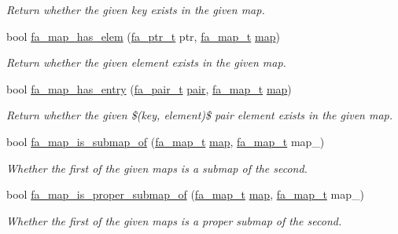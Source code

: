 \begin{DoxyCompactItemize}
\begin{DoxyCompactList}\small\item\em Return whether the given key exists in the given map. \end{DoxyCompactList}\item 
bool \hyperlink{group___fa_map_gac36e905827b6b35ce95fb8add39ec61a}{fa\-\_\-map\-\_\-has\-\_\-elem} (\hyperlink{group___fa_ga915ddeae99ad7568b273d2b876425197}{fa\-\_\-ptr\-\_\-t} ptr, \hyperlink{group___fa_map_gadcbb0c425af31be6aeb265159b2a7db0}{fa\-\_\-map\-\_\-t} \hyperlink{literals_8h_a44305f0bc81207be0dcc90650733e331}{map})
\begin{DoxyCompactList}\small\item\em Return whether the given element exists in the given map. \end{DoxyCompactList}\item 
bool \hyperlink{group___fa_map_ga7001e19d64d3e0a95c4f49ec07c06ea9}{fa\-\_\-map\-\_\-has\-\_\-entry} (\hyperlink{group___fa_pair_gac2b2e58c230bac4f8a63ef6c05072680}{fa\-\_\-pair\-\_\-t} \hyperlink{util_8h_a40ed40659d2ed7f8712b0fe6ba6edebe}{pair}, \hyperlink{group___fa_map_gadcbb0c425af31be6aeb265159b2a7db0}{fa\-\_\-map\-\_\-t} \hyperlink{literals_8h_a44305f0bc81207be0dcc90650733e331}{map})
\begin{DoxyCompactList}\small\item\em Return whether the given \$(key, element)\$ pair element exists in the given map. \end{DoxyCompactList}\item 
bool \hyperlink{group___fa_map_ga589cc956fd74abb3fcd05fbc96ae1874}{fa\-\_\-map\-\_\-is\-\_\-submap\-\_\-of} (\hyperlink{group___fa_map_gadcbb0c425af31be6aeb265159b2a7db0}{fa\-\_\-map\-\_\-t} \hyperlink{literals_8h_a44305f0bc81207be0dcc90650733e331}{map}, \hyperlink{group___fa_map_gadcbb0c425af31be6aeb265159b2a7db0}{fa\-\_\-map\-\_\-t} map\-\_\-)
\begin{DoxyCompactList}\small\item\em Whether the first of the given maps is a submap of the second. \end{DoxyCompactList}\item 
bool \hyperlink{group___fa_map_ga9a003ebb1dd563e308197eede6bfd3c2}{fa\-\_\-map\-\_\-is\-\_\-proper\-\_\-submap\-\_\-of} (\hyperlink{group___fa_map_gadcbb0c425af31be6aeb265159b2a7db0}{fa\-\_\-map\-\_\-t} \hyperlink{literals_8h_a44305f0bc81207be0dcc90650733e331}{map}, \hyperlink{group___fa_map_gadcbb0c425af31be6aeb265159b2a7db0}{fa\-\_\-map\-\_\-t} map\-\_\-)
\begin{DoxyCompactList}\small\item\em Whether the first of the given maps is a proper submap of the second. \end{DoxyCompactList}\item 

\end{DoxyCompactItemize}
